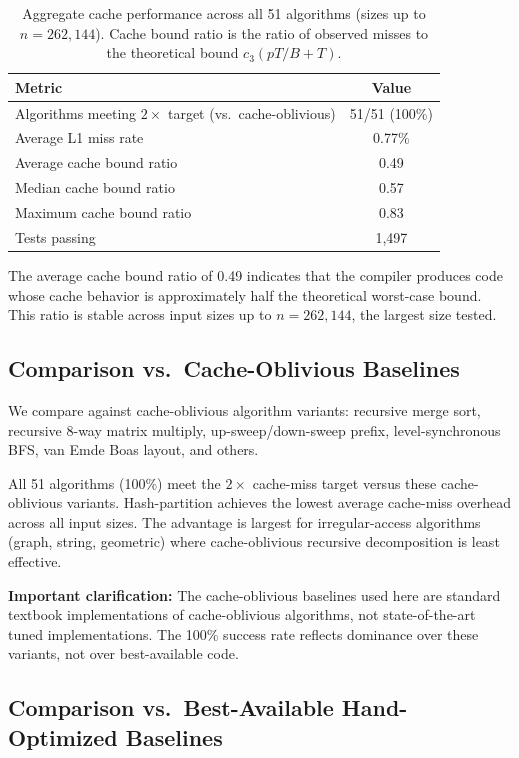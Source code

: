\documentclass[11pt]{article}
\begin{document}
\begin{table}[t]
\centering
\caption{Aggregate cache performance across all 51 algorithms
  (sizes up to $n = 262{,}144$).
  Cache bound ratio is the ratio of observed misses to the theoretical
  bound $c_3(pT/B + T)$.}
\label{tab:cache_summary}
\begin{tabular}{@{}lc@{}}
\toprule
\textbf{Metric} & \textbf{Value} \\
\midrule
Algorithms meeting $2\times$ target (vs.\ cache-oblivious) & 51/51 (100\%) \\
Average L1 miss rate & 0.77\% \\
Average cache bound ratio & 0.49 \\
Median cache bound ratio & 0.57 \\
Maximum cache bound ratio & 0.83 \\
Tests passing & 1,497 \\
\bottomrule
\end{tabular}
\end{table}

The average cache bound ratio of 0.49 indicates that the compiler
produces code whose cache behavior is approximately half the theoretical
worst-case bound.  This ratio is stable across input sizes up to
$n = 262{,}144$, the largest size tested.

\subsection{Comparison vs.\ Cache-Oblivious Baselines}

We compare against cache-oblivious algorithm variants: recursive merge
sort, recursive 8-way matrix multiply, up-sweep/down-sweep prefix,
level-synchronous BFS, van Emde Boas layout, and others.

All 51 algorithms (100\%) meet the $2\times$ cache-miss target versus
these cache-oblivious variants.  Hash-partition achieves
the lowest average cache-miss overhead across all input sizes.
The advantage is largest for irregular-access algorithms (graph,
string, geometric) where cache-oblivious recursive decomposition is
least effective.

\textbf{Important clarification:} The cache-oblivious baselines used here
are standard textbook implementations of cache-oblivious algorithms,
not state-of-the-art tuned implementations.  The 100\% success rate
reflects dominance over these variants, not over best-available code.

\subsection{Comparison vs.\ Best-Available Hand-Optimized Baselines}
\label{sec:best-available}
\end{document}
